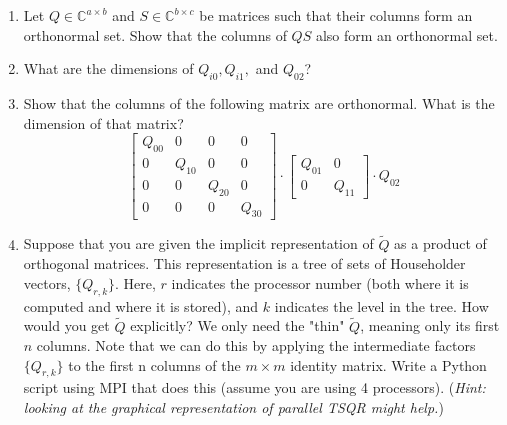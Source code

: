\documentclass[11pt]{article}
\begin{document}
\begin{enumerate}
    \item Let $Q \in \mathbb{C}^{a \times b}$ and $S \in \mathbb{C}^{b \times c}$ be matrices such that their columns form an orthonormal set. Show that the columns of $QS$ also form an orthonormal set. 
    \item What are the dimensions of $Q_{i0}, Q_{i1},$ and $Q_{02}$?
    \item Show that the columns of the following matrix are orthonormal. What is the dimension of that matrix?
    \[ \begin{bmatrix} Q_{00} & 0 & 0 & 0 \\ 0 & Q_{10} & 0 & 0 \\ 0 & 0 & Q_{20} & 0 \\ 0 & 0 & 0 & Q_{30} \end{bmatrix} \cdot \begin{bmatrix} Q_{01} & 0 \\ 0 & Q_{11} \end{bmatrix} \cdot Q_{02}  \]
    \item Suppose that you are given the implicit representation of $\tilde{Q}$ as a product of orthogonal matrices. This representation is a tree of sets of Householder vectors, $\{Q_{r, k}\}$. Here, $r$ indicates the processor
number (both where it is computed and where it is stored), and
$k$ indicates the level in the tree. How would you get $\tilde{Q}$ explicitly? We only need the "thin" $\tilde{Q}$, meaning only its first $n$ columns. Note that we can do this by applying the intermediate factors $\{Q_{r, k}\}$ to the first n columns of the $m \times m$ identity matrix. Write a Python script using MPI that does this (assume you are using 4 processors). (\textit{Hint: looking at the graphical representation of parallel TSQR might help.})
    
    
 

    
\end{enumerate}
\end{document}
